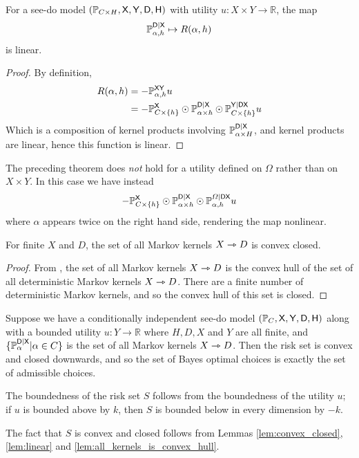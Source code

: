 \begin{lemma}\label{lem:linear}
For a see-do model $(\mathbb{P}_{C\times H}, \mathsf{X},\mathsf{Y},\mathsf{D},\mathsf{H})$ with utility $u:X\times Y\to \mathbb{R}$, the map
\begin{align}
    \mathbb{P}_{\alpha,h}^{\mathsf{D}|\mathsf{X}}\mapsto R(\alpha,h)
\end{align}
is linear.
\end{lemma}

\begin{proof}
By definition,
\begin{align}
    R(\alpha,h) &= - \mathbb{P}_{\alpha,h}^{\mathsf{XY}} u\\
    &= -\mathbb{P}_{C\times\{h\}}^{\mathsf{X}} \odot \mathbb{P}_{\alpha\times h}^{\mathsf{D}|\mathsf{X}} \odot \mathbb{P}_{C\times\{h\}}^{\mathsf{Y}|\mathsf{DX}} u
\end{align}
Which is a composition of kernel products involving $\mathbb{P}_{\alpha\times H}^{\mathsf{D}|\mathsf{X}}$, and kernel products are linear, hence this function is linear.
\end{proof}

The preceding theorem does \emph{not} hold for a utility defined on $\Omega$ rather than on $X\times Y$. In this case we have instead
\begin{align}
    -\mathbb{P}_{C\times\{h\}}^{\mathsf{X}} \odot \mathbb{P}_{\alpha\times h}^{\mathsf{D}|\mathsf{X}} \odot \mathbb{P}_{\alpha,h}^{\Omega|\mathsf{DX}} u
\end{align}
where $\alpha$ appears twice on the right hand side, rendering the map nonlinear.

\begin{lemma}\label{lem:all_kernels_is_convex_hull}
For finite $X$ and $D$, the set of all Markov kernels $X\rightarrowtriangle D$ is convex closed.
\end{lemma}

\begin{proof}
From \citet{blackwell_theory_1979}, the set of all Markov kernels $X\rightarrowtriangle D$ is the convex hull of the set of all deterministic Markov kernels $X\rightarrowtriangle D$. There are a finite number of deterministic Markov kernels, and so the convex hull of this set is closed.
\end{proof}

\begin{example}\label{ex:cc_sdt}
Suppose we have a conditionally independent see-do model $(\mathbb{P}_{C}, \mathsf{X},\mathsf{Y},\mathsf{D},\mathsf{H})$ along with a bounded utility $u:Y\to \mathbb{R}$ where $H,D,X$ and $Y$ are all finite, and $\{\mathbb{P}_\alpha^{\mathsf{D}|\mathsf{X}}|\alpha\in C\}$ is the set of all Markov kernels $X\rightarrowtriangle D$. Then the risk set is convex and closed downwards, and so the set of Bayes optimal choices is exactly the set of admissible choices.

The boundedness of the risk set $S$ follows from the boundedness of the utility $u$; if $u$ is bounded above by $k$, then $S$ is bounded below in every dimension by $-k$.

The fact that $S$ is convex and closed follows from Lemmas \ref{lem:convex_closed}, \ref{lem:linear} and \ref{lem:all_kernels_is_convex_hull}.
\end{example}

